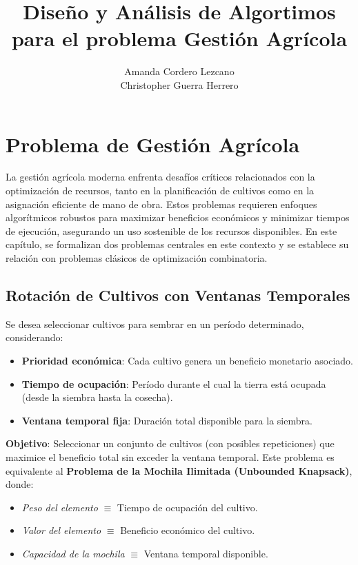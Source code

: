 \documentclass{report}
\title{Diseño y Análisis de Algortimos para el problema Gestión Agrícola}
\author{Amanda Cordero Lezcano\\Christopher Guerra Herrero}
\date{}
\begin{document}
	
	\maketitle
	\tableofcontents
	
	\chapter{Problema de Gestión Agrícola}
	
	
	La gestión agrícola moderna enfrenta desafíos críticos relacionados con la optimización de recursos, tanto en la planificación de cultivos como en la asignación eficiente de mano de obra. Estos problemas requieren enfoques algorítmicos robustos para maximizar beneficios económicos y minimizar tiempos de ejecución, asegurando un uso sostenible de los recursos disponibles. En este capítulo, se formalizan dos problemas centrales en este contexto y se establece su relación con problemas clásicos de optimización combinatoria.

	\section{Rotación de Cultivos con Ventanas Temporales}
	Se desea seleccionar cultivos para sembrar en un período determinado, considerando:
	\begin{itemize}
		\item \textbf{Prioridad económica}: Cada cultivo genera un beneficio monetario asociado.
		\item \textbf{Tiempo de ocupación}: Período durante el cual la tierra está ocupada (desde la siembra hasta la cosecha).
		\item \textbf{Ventana temporal fija}: Duración total disponible para la siembra.
	\end{itemize}
	
	\textbf{Objetivo}: Seleccionar un conjunto de cultivos (con posibles repeticiones) que maximice el beneficio total sin exceder la ventana temporal. Este problema es equivalente al \textbf{Problema de la Mochila Ilimitada (Unbounded Knapsack)}, donde:
	\begin{itemize}
		\item \textit{Peso del elemento} $\equiv$ Tiempo de ocupación del cultivo.
		\item \textit{Valor del elemento} $\equiv$ Beneficio económico del cultivo.
		\item \textit{Capacidad de la mochila} $\equiv$ Ventana temporal disponible.
	\end{itemize}
	
\end{document}
